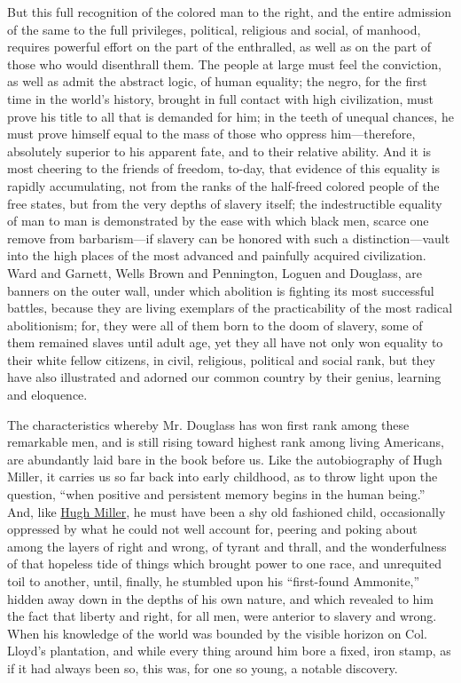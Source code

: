 But this full recognition of the colored man to the right, and the
entire admission of the same to the full privileges, political,
religious and social, of manhood, requires powerful effort on the part
of the enthralled, as well as on the part of those who would disenthrall
them. The people at large must feel the conviction, as well as admit the
abstract logic, of human equality; the negro, for the first time in the
world's history, brought in full contact with high civilization, must
prove his title to all that is demanded for him; in the teeth of unequal
chances, he must prove himself equal to the mass of those who oppress
him---therefore, absolutely superior to his apparent fate, and to their
relative ability. And it is most cheering to the friends of freedom,
to-day, that evidence of this equality is {}rapidly accumulating, not
from the ranks of the half-freed colored people of the free states, but
from the very depths of slavery itself; the indestructible equality of
man to man is demonstrated by the ease with which black men, scarce one
remove from barbarism---if slavery can be honored with such a
distinction---vault into the high places of the most advanced and
painfully acquired civilization. Ward and Garnett, Wells Brown and
Pennington, Loguen and Douglass, are banners on the outer wall, under
which abolition is fighting its most successful battles, because they
are living exemplars of the practicability of the most radical
abolitionism; for, they were all of them born to the doom of slavery,
some of them remained slaves until adult age, yet they all have not only
won equality to their white fellow citizens, in civil, religious,
political and social rank, but they have also illustrated and adorned
our common country by their genius, learning and eloquence.

The characteristics whereby Mr. Douglass has won first rank among these
remarkable men, and is still rising toward highest rank among living
Americans, are abundantly laid bare in the book before us. Like the
autobiography of Hugh Miller, it carries us so far back into early
childhood, as to throw light upon the question, ``when positive and
persistent memory begins in the human being.'' And, like
\href{/wiki/Author:Hugh_Miller_(1802-1856)}{Hugh Miller}, he must have
been a shy old fashioned child, occasionally oppressed by what he could
not well account for, peering and poking about among the layers of right
and wrong, of tyrant and thrall, and the wonderfulness of that hopeless
tide of things which brought power to one race, and unrequited toil to
another, until, finally, he stumbled upon his ``first-found Ammonite,''
hidden away down in the depths of his own nature, and which revealed to
him the fact that liberty and right, for all men, were anterior to
slavery and wrong. When his knowledge of the world was bounded by the
visible horizon on Col. Lloyd's plantation, and while every thing around
him bore a fixed, iron stamp, as if it had always been so, this was, for
one so young, a notable discovery.

